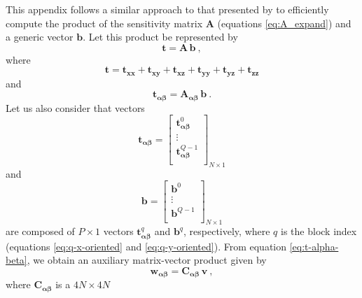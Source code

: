 \documentclass[manuscript,noblind]{geophysics}
\begin{document}
This appendix follows a similar approach to that presented by \citet{takahashi2020convolutional}
to efficiently compute the product of the sensitivity matrix
$\mathbf{A}$ (equations \ref{eq:A_expand}) and a generic vector $\mathbf{b}$. 
Let this product be represented by
\begin{equation}
	\mathbf{t} = 
	\mathbf{A} \, \mathbf{b} \: ,
	\label{eq:t}
\end{equation}
where 
\begin{equation}
	\mathbf{t} = \mathbf{t}_{\boldsymbol{xx}} + \mathbf{t}_{\boldsymbol{xy}} + \mathbf{t}_{\boldsymbol{xz}} +
	\mathbf{t}_{\boldsymbol{yy}} + \mathbf{t}_{\boldsymbol{yz}} + \mathbf{t}_{\boldsymbol{zz}}
	\label{eq:t-components}
\end{equation}
and
\begin{equation}
	\mathbf{t}_{\boldsymbol{\alpha\beta}} = 
	\mathbf{A_{\boldsymbol{\alpha\beta}}} \, \mathbf{b} \: .
	\label{eq:t-alpha-beta}
\end{equation}
Let us also consider that vectors
\begin{equation}
	\mathbf{t}_{\boldsymbol{\alpha\beta}} = \begin{bmatrix}
		\mathbf{t}^{0}_{\boldsymbol{\alpha\beta}} \\
		\vdots \\
		\mathbf{t}^{Q-1}_{\boldsymbol{\alpha\beta}} \\
	\end{bmatrix}_{N \times 1}
	\label{eq:t-alpha-beta-partitioned}
\end{equation} 
and
\begin{equation}
	\mathbf{b} = \begin{bmatrix}
		\mathbf{b}^{0} \\
		\vdots \\
		\mathbf{b}^{Q-1} \\
	\end{bmatrix}_{N \times 1}
	\label{eq:b-partitioned}
\end{equation}
are composed of $P \times 1$ vectors $\mathbf{t}^{q}_{\boldsymbol{\alpha\beta}}$ and $\mathbf{b}^{q}$,
respectively, where $q$ is the block index (equations \ref{eq:q-x-oriented} and \ref{eq:q-y-oriented}). 
From equation \ref{eq:t-alpha-beta}, we obtain an auxiliary matrix-vector product given by
\begin{equation}
	\mathbf{w}_{\boldsymbol{\alpha\beta}} = \mathbf{C}_{\boldsymbol{\alpha\beta}} \, \mathbf{v} \: ,
	\label{eq:w_alpha_beta}
\end{equation}
where $\mathbf{C}_{\boldsymbol{\alpha\beta}}$ is a $4N \times 4N$ 
\end{document}
